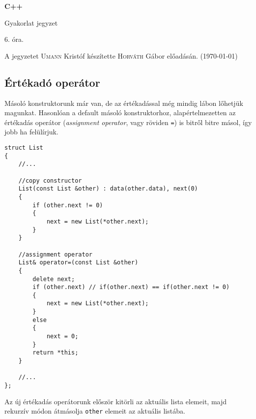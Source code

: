 \documentclass[a4paper,11.5pt]{article}
\begin{document}
	\setlength\parindent{0pt}
	\def\s{\hspace{0.2mm}\vphantom{\beta}}
	\def\Z{\mathbb{Z}}
	\def\Q{\mathbb{Q}}
	\def\R{\mathbb{R}}
	\def\C{\mathbb{C}}
	\def\N{\mathbb{N}}
	\def\Ra{\overline{\mathbb{R}}}
	
	\def\sume{\displaystyle\sum_{n=1}^{+\infty}}
	\def\sumn{\displaystyle\sum_{n=0}^{+\infty}}
	
	\def\narrow{\underset{n\rightarrow+\infty}{\longrightarrow}}
	\def\limn{\displaystyle\lim_{n\to +\infty}}
	\def\limx{\displaystyle\lim_{x\to +\infty}}
	
	\theoremstyle{definition}
	\newtheorem{theorem}{Tétel}[subsection] 
	
	\theoremstyle{definition}
	\newtheorem{definition}[theorem]{Definíció} 
	\newtheorem{example}[theorem]{Példa} 
	\newtheorem{task}[theorem]{Feladat} 
	\newtheorem{note}[theorem]{Megjegyzés}
	\begin{center}
		{\LARGE\textbf{C++}}
		
		{\Large Gyakorlat jegyzet}
		
		6. óra.
	\end{center}
	A jegyzetet \textsc{Umann} Kristóf készítette \textsc{Horváth} Gábor  előadásán. (\today)
	\subsection{Értékadó operátor}
	Másoló konstruktorunk már van, de az értékadással még mindig lábon lőhetjük magunkat. Hasonlóan a default másoló konstruktorhoz, alapértelmezetten az értékadás operátor (\textit{assignment operator}, vagy röviden \texttt{=}) is bitről bitre másol, így jobb ha felülírjuk.
\begin{lstlisting}
struct List
{
	//...
	
	//copy constructor
	List(const List &other) : data(other.data), next(0)
	{
		if (other.next != 0)
		{
			next = new List(*other.next);
		}
	}
	
	//assignment operator
	List& operator=(const List &other)
	{
		delete next;
		if (other.next) // if(other.next) == if(other.next != 0)
		{
			next = new List(*other.next);
		}
		else
		{
			next = 0;
		}
		return *this;
	}
	
	//...
};
\end{lstlisting}
	Az új értékadás operátorunk először kitörli az aktuális lista elemeit, majd rekurzív módon átmásolja \texttt{other} elemeit az aktuális listába.
	
\end{document}
